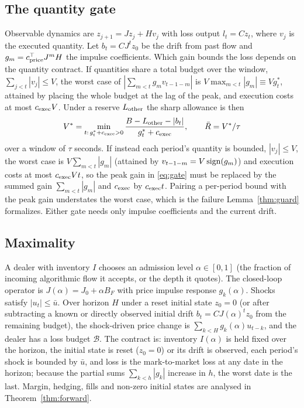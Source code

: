 \documentclass[12pt]{article}
\theoremstyle{definition}
\theoremstyle{remark}
\begin{document}
\subsection{The quantity gate}
Observable dynamics are $z_{j+1}=Jz_j+Hv_j$ with loss output $l_t=Cz_t$, where $v_j$ is the executed quantity. Let $b_t=CJ^tz_0$ be the drift from past flow and $g_m=c^\top_{\rm price}J^mH$ the impulse coefficients. Which gain bounds the loss depends on the quantity contract. If quantities share a total budget over the window, $\sum_{j<t}|v_j|\le V$, the worst case of $|\sum_{m<t}g_mv_{t-1-m}|$ is $V\max_{m<t}|g_m|\equiv Vg^*_t$, attained by placing the whole budget at the lag of the peak, and execution costs at most $c_{\rm exec}V$. Under a reserve $L_{\rm other}$ the sharp allowance is then
\begin{equation}\label{eq:gate}
V^*=\min_{t:\,g^*_t+c_{\rm exec}>0}\frac{B-L_{\rm other}-|b_t|}{g^*_t+c_{\rm exec}},\qquad\bar R=V^*/\tau
\end{equation}
over a window of $\tau$ seconds. If instead each period's quantity is bounded, $|v_j|\le V$, the worst case is $V\sum_{m<t}|g_m|$ (attained by $v_{t-1-m}=V\,{\rm sign}(g_m)$) and execution costs at most $c_{\rm exec}Vt$, so the peak gain in \eqref{eq:gate} must be replaced by the summed gain $\sum_{m<t}|g_m|$ and $c_{\rm exec}$ by $c_{\rm exec}t$. Pairing a per-period bound with the peak gain understates the worst case, which is the failure Lemma~\ref{thm:guard} formalizes. Either gate needs only impulse coefficients and the current drift.

\subsection{Maximality}
A dealer with inventory $I$ chooses an admission level $\alpha\in[0,1]$ (the fraction of incoming algorithmic flow it accepts, or the depth it quotes). The closed-loop operator is $J(\alpha)=J_0+\alpha B_F$ with price impulse response $g_k(\alpha)$. Shocks satisfy $|u_t|\le\bar u$. Over horizon $H$ under a reset initial state $z_0=0$ (or after subtracting a known or directly observed initial drift $b_t=CJ(\alpha)^t z_0$ from the remaining budget), the shock-driven price change is $\sum_{k<H}g_k(\alpha)u_{t-k}$, and the dealer has a loss budget $\mathcal B$. The contract is: inventory $I(\alpha)$ is held fixed over the horizon, the initial state is reset ($z_0=0$) or its drift is observed, each period's shock is bounded by $\bar u$, and loss is the mark-to-market loss at any date in the horizon; because the partial sums $\sum_{k<h}|g_k|$ increase in $h$, the worst date is the last. Margin, hedging, fills and non-zero initial states are analysed in Theorem~\ref{thm:forward}.
\end{document}
